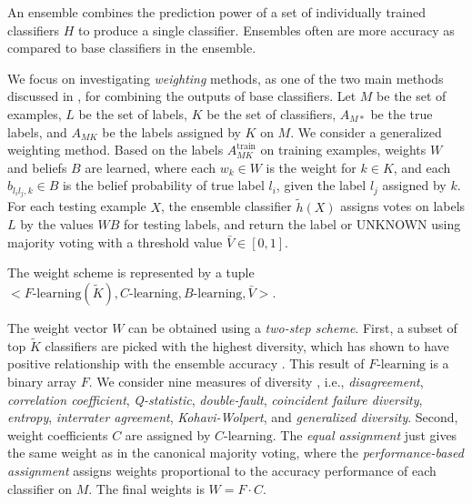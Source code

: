 An ensemble combines the prediction power of a set of individually trained classifiers $H$ to produce a single classifier. Ensembles often are more accuracy as compared to base classifiers in the ensemble. %

We focus on investigating \emph{weighting} methods, as one of the two main methods discussed in \cite{rokach2010ensemble}, for combining the outputs of base classifiers. Let $M$ be the set of examples, $L$ be the set of labels, $K$ be the set of classifiers, $A_{M*}$ be the true labels, and $A_{MK}$ be the labels assigned by $K$ on $M$. We consider a generalized weighting method. Based on the labels $A_{MK}^\text{train}$ on training examples, weights $W$ and beliefs $B$ are learned, where each $w_k \in W$ is the weight for $k\in K$, and each $b_{l_il_j,k} \in B$ is the belief probability of true label $l_i$, given the label $l_j$ assigned by $k$. For each testing example $X$, the ensemble classifier $\tilde{h}(X)$ assigns votes on labels $L$ by the values $WB$ for testing labels, and return the label or UNKNOWN using majority voting with a threshold value $\bar{V} \in [0, 1]$.

The weight scheme is represented by a tuple $<F\text{-learning}(\tilde{K}), C\text{-learning}, B\text{-learning}, \bar{V}>$.

The weight vector $W$ can be obtained using a \emph{two-step scheme}. First, a subset of top $\tilde{K}$ classifiers are picked with the highest diversity, which has shown to have positive relationship with the ensemble accuracy \cite{kuncheva2003measures}. This result of $F\text{-learning}$ is a binary array $F$. We consider nine measures of diversity \cite{kuncheva2003measures}, i.e., \emph{disagreement}, \emph{correlation coefficient}, \emph{Q-statistic}, \emph{double-fault}, \emph{coincident failure diversity}, \emph{entropy}, \emph{interrater agreement}, \emph{Kohavi-Wolpert}, and \emph{generalized diversity}. Second, weight coefficients $C$ are assigned by $C\text{-learning}$. The \emph{equal assignment} just gives the same weight as in the canonical majority voting, where the \emph{performance-based assignment} \cite{opitz1996generating} assigns weights proportional to the accuracy performance of each classifier on $M$. The final weights is $W=F\cdot C$.


